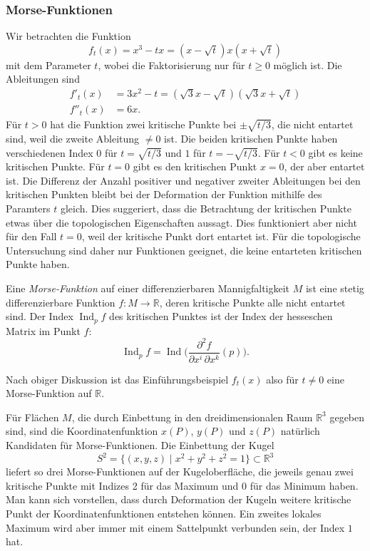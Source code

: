 \subsubsection{Morse-Funktionen}
Wir betrachten die Funktion
\[
f_t(x)
=
x^3-tx
=
(x-\!\sqrt{t})x(x+\!\sqrt{t})
\]
mit dem Parameter $t$, wobei die Faktorisierung nur für $t\ge 0$ möglich
ist.
Die Ableitungen sind
\begin{align*}
f'_t(x)
&=
3x^2-t
=
(\!\sqrt{3}x-\!\sqrt{t})
(\!\sqrt{3}x+\!\sqrt{t})
\\
f''_t(x)
&=
6x.
\end{align*}
Für $t> 0$ hat die Funktion zwei kritische Punkte bei $\pm\!\sqrt{t/3}$,
die nicht entartet sind, weil die zweite Ableitung $\ne 0$ ist.
Die beiden kritischen Punkte haben verschiedenen
Index $0$ für $t=\!\sqrt{t/3}$
und $1$ für $t=-\!\sqrt{t/3}$.
Für $t<0$ gibt es keine kritischen Punkte.
Für $t=0$ gibt es den kritischen Punkt $x=0$, der aber entartet ist.
Die Differenz der Anzahl positiver und negativer zweiter Ableitungen
bei den kritischen Punkten bleibt bei der Deformation der Funktion 
mithilfe des Paramters $t$ gleich.
Dies suggeriert, dass die Betrachtung der kritischen Punkte etwas
über die topologischen Eigenschaften aussagt.
Dies funktioniert aber nicht für den Fall $t=0$, weil der kritische
Punkt dort entartet ist.
Für die topologische Untersuchung sind daher nur Funktionen geeignet,
die keine entarteten kritischen Punkte haben.

\begin{definition}
%
Eine {\em Morse-Funktion} auf einer differenzierbaren Mannigfaltigkeit
$M$ ist eine stetig differenzierbare Funktion $f\colon M\to\mathbb{R}$,
deren kritische Punkte alle nicht entartet sind.
Der Index $\operatorname{Ind}_pf$ des kritischen Punktes ist der Index
der hesseschen Matrix im Punkt $f$:
\[
\operatorname{Ind}_pf
=
\operatorname{Ind}\biggl(
\frac{\partial^2 f}{\partial x^i\,\partial x^k}(p)
\biggr).
\]
\end{definition}

Nach obiger Diskussion ist das Einführungsbeispiel $f_t(x)$ also für
$t\ne0$ eine Morse-Funktion auf $\mathbb{R}$.

Für Flächen $M$, die durch Einbettung in den dreidimensionalen Raum
$\mathbb{R}^3$ gegeben sind, sind die Koordinatenfunktion
$x(P)$, $y(P)$ und $z(P)$ natürlich Kandidaten für Morse-Funktionen.
Die Einbettung der Kugel
\[
S^2
=
\{ (x,y,z)\mid x^2+y^2+z^2=1 \}
\subset
\mathbb{R}^3
\]
liefert so drei Morse-Funktionen auf der Kugeloberfläche, die jeweils
genau zwei kritische Punkte mit Indizes 2 für das Maximum und
0 für das Minimum haben.
Man kann sich vorstellen, dass durch Deformation der Kugeln weitere
kritische Punkt der Koordinatenfunktionen entstehen können.
Ein zweites lokales Maximum wird aber immer mit einem Sattelpunkt
verbunden sein, der Index $1$ hat.

